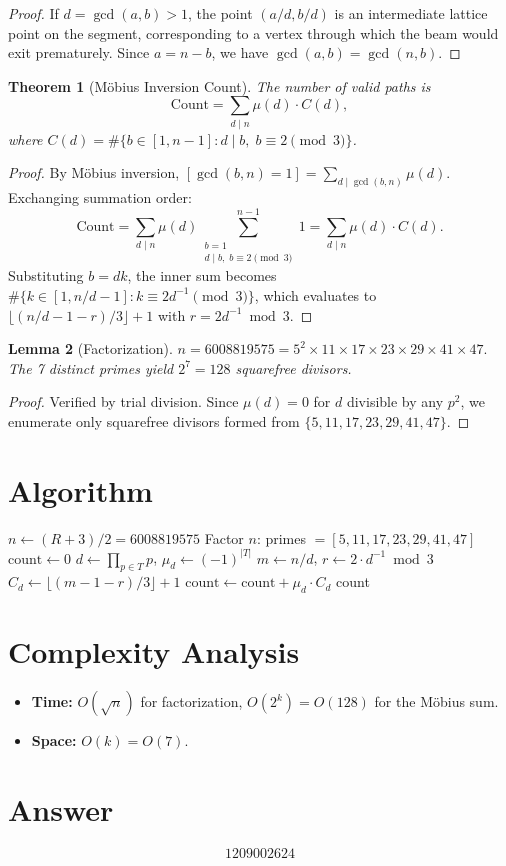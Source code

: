 \documentclass[12pt]{article}
\newtheorem{theorem}{Theorem}
\newtheorem{lemma}[theorem]{Lemma}
\begin{document}
\begin{proof}
If $d = \gcd(a,b) > 1$, the point $(a/d, b/d)$ is an intermediate lattice point on the segment,
corresponding to a vertex through which the beam would exit prematurely. Since $a = n - b$,
we have $\gcd(a,b) = \gcd(n,b)$.
\end{proof}

\begin{theorem}[M\"obius Inversion Count]
The number of valid paths is
\[
\mathrm{Count} = \sum_{d \mid n} \mu(d) \cdot C(d),
\]
where $C(d) = \#\{b \in [1, n-1] : d \mid b,\; b \equiv 2 \pmod{3}\}$.
\end{theorem}

\begin{proof}
By M\"obius inversion, $[\gcd(b,n)=1] = \sum_{d \mid \gcd(b,n)} \mu(d)$. Exchanging
summation order:
\[
\mathrm{Count} = \sum_{d \mid n} \mu(d) \sum_{\substack{b=1 \\ d \mid b,\; b \equiv 2\!\!\pmod{3}}}^{n-1} 1
= \sum_{d \mid n} \mu(d) \cdot C(d).
\]
Substituting $b = dk$, the inner sum becomes $\#\{k \in [1, n/d - 1] : k \equiv 2d^{-1}\!\!\pmod{3}\}$,
which evaluates to $\lfloor(n/d - 1 - r)/3\rfloor + 1$ with $r = 2d^{-1}\!\!\bmod 3$.
\end{proof}

\begin{lemma}[Factorization]
$n = 6008819575 = 5^2 \times 11 \times 17 \times 23 \times 29 \times 41 \times 47.$
The 7 distinct primes yield $2^7 = 128$ squarefree divisors.
\end{lemma}

\begin{proof}
Verified by trial division. Since $\mu(d) = 0$ for $d$ divisible by any $p^2$, we enumerate
only squarefree divisors formed from $\{5, 11, 17, 23, 29, 41, 47\}$.
\end{proof}

\section{Algorithm}

\begin{algorithmic}[1]
\State $n \gets (R + 3)/2 = 6008819575$
\State Factor $n$: primes $= [5, 11, 17, 23, 29, 41, 47]$
\State $\mathrm{count} \gets 0$
    \State $d \gets \prod_{p \in T} p$, \quad $\mu_d \gets (-1)^{|T|}$
    \State $m \gets n/d$, \quad $r \gets 2 \cdot d^{-1} \bmod 3$
    \State $C_d \gets \lfloor(m - 1 - r)/3\rfloor + 1$
    \State $\mathrm{count} \gets \mathrm{count} + \mu_d \cdot C_d$
\EndFor
\State \Return count
\end{algorithmic}

\section{Complexity Analysis}
\begin{itemize}
    \item \textbf{Time:} $O(\sqrt{n})$ for factorization, $O(2^k) = O(128)$ for the M\"obius sum.
    \item \textbf{Space:} $O(k) = O(7)$.
\end{itemize}

\section{Answer}

\[
\boxed{1209002624}
\]
\end{document}
